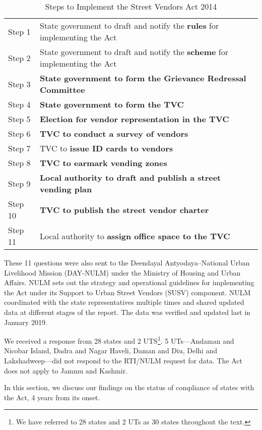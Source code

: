 \documentclass[a4paper, 12pt, twoside]{article}
\begin{document}
\begin{table}[htpb]
\caption{Steps to Implement the Street Vendors Act 2014}
\begin{tabular}{ l  l } %
\toprule
Step 1	&	State government to draft and notify the \textbf{rules} for implementing the Act\\
Step 2 	&	State government to draft and notify the \textbf{scheme} for implementing the Act\\
Step 3	&	\textbf{State government to form the Grievance Redressal Committee}\\
Step 4	&	\textbf{State government to form the TVC}\\
Step 5	&	\textbf{Election for vendor representation in the TVC}\\
Step 6	&	\textbf{TVC to conduct a survey of vendors}\\
Step 7	&	TVC to \textbf{issue ID cards to vendors}\\
Step 8	&	\textbf{TVC to earmark vending zones}\\
Step 9 	&	\textbf{Local authority to draft and publish a street vending plan}\\
Step 10	&	\textbf{TVC to publish the street vendor charter}\\
Step 11	&	Local authority to \textbf{assign office space to the TVC}\\
\bottomrule
\end{tabular}
\end{table}


	These 11 questions were also sent to the Deendayal Antyodaya–National Urban Livelihood Mission (DAY-NULM) under the Ministry of Housing and Urban Affairs. NULM sets out the strategy and operational guidelines for implementing the Act under its Support to Urban Street Vendors (SUSV) component. NULM coordinated with the state representatives multiple times and shared updated data at different stages of the report. The data was verified and updated last in January 2019.

	We received a response from 28 states and 2 UTS\footnote{ We have referred to 28 states and 2 UTs as 30 states throughout the text.}. 5 UTs—Andaman and Nicobar Island, Dadra and Nagar Haveli, Daman and Diu, Delhi and Lakshadweep—did not respond to the RTI/NULM request for data. The Act does not apply to Jammu and Kashmir.

	In this section, we discuss our findings on the status of compliance of states with the Act, 4 years from its onset.
\end{document}
